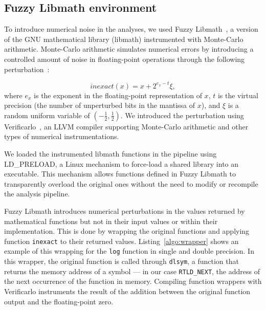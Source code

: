 \documentclass[11pt,onecolumn]{article}
\begin{document}
\subsection{Fuzzy Libmath environment}

To introduce numerical noise in the analyses, we used
Fuzzy Libmath~\cite{salari2021accurate}, a version of the GNU
mathematical library (libmath) instrumented with Monte-Carlo arithmetic.
Monte-Carlo arithmetic simulates numerical errors
by introducing a controlled amount of noise in floating-point
operations through the following perturbation~\cite{Parker1997-qq}:

\begin{equation} \label{eq:mca_inexact}
  inexact(x) = x + 2^{e_x-t}\xi,
\end{equation}
where $e_x$ is the exponent in the floating-point representation of $x$,
$t$ is the virtual precision (the number of unperturbed bits in the
mantissa of $x$), and $\xi$ is a random uniform variable of
$(-\frac{1}{2}, \frac{1}{2})$. We introduced the perturbation using
Verificarlo~\cite{denis2015verificarlo}, an LLVM compiler supporting Monte-Carlo
arithmetic and other types of numerical instrumentations.

We loaded the instrumented libmath functions in the pipeline using
LD\_PRELOAD, a Linux mechanism to force-load a shared library into an
executable. This mechanism allows functions defined in Fuzzy Libmath to transparently
overload the original ones without the need to modify or recompile the
analysis pipeline.

Fuzzy Libmath introduces numerical perturbations in the values returned by
mathematical functions but not in their input values or within their
implementation. This is done by wrapping the original functions and
applying function \texttt{inexact} to their returned values.
Listing~\ref{algo:wrapper} shows an example of this wrapping for the
\texttt{log} function in single and double precision. In this wrapper, the
original function is called through \texttt{dlsym}, a function that returns
the memory address of a symbol --- in our case \texttt{RTLD\_NEXT}, the
address of the next occurrence of the function in memory. Compiling function wrappers
with Verificarlo instruments the result of the
addition between the original function output and the floating-point zero.


\end{document}
